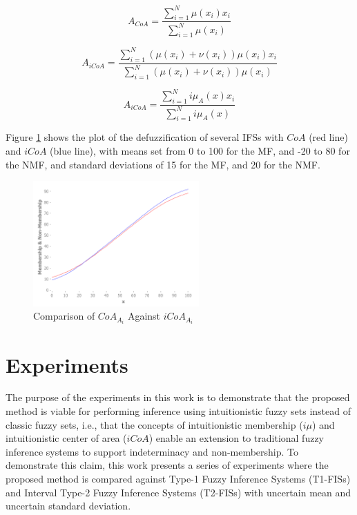 \documentclass[conference]{IEEEtran}
\begin{document}
\begin{equation}
  \label{center-of-area}
  A_{CoA} = \dfrac{\sum_{i=1}^{N} \mu(x_{i})
    x_{i}}{\sum_{i=1}^{N} \mu(x_{i})}
\end{equation}

\begin{equation}
  \label{if-coa}
  A_{iCoA} = \dfrac{\sum_{i=1}^{N} (\mu(x_{i}) + \nu(x_{i})) \mu(x_{i})
    x_{i}}{\sum_{i=1}^{N} (\mu(x_{i}) + \nu(x_{i})) \mu(x_{i})}
\end{equation}

\begin{equation}
  \label{if-coa-simplified}
  A_{iCoA} = \dfrac{\sum_{i=1}^{N} i\mu_{A}(x) x_{i}}{\sum_{i=1}^{N}
    i\mu_{A}(x)}
\end{equation}

Figure \ref{if-coa-vs-coa} shows the plot of the defuzzification of
several IFSs with $CoA$ (red line) and $iCoA$ (blue line), with means set
from 0 to 100 for the MF, and -20 to 80 for the NMF, and standard
deviations of 15 for the MF, and 20 for the NMF.

\begin{figure}[!t]
  \centering
  \includegraphics[width=2.5in]{if-coa-vs-coa}
  \caption{Comparison of $CoA_{A_{i}}$ Against $iCoA_{A_{i}}$}
  \label{if-coa-vs-coa}
\end{figure}

\section{Experiments}
\label{experiments}

The purpose of the experiments in this work is to demonstrate that the
proposed method is viable for performing inference using
intuitionistic fuzzy sets instead of classic fuzzy sets, i.e., that
the concepts of intuitionistic membership ($i\mu$) and intuitionistic
center of area ($iCoA$) enable an extension to traditional fuzzy
inference systems to support indeterminacy and non-membership. To
demonstrate this claim, this work presents a series of experiments
where the proposed method is compared against Type-1 Fuzzy Inference
Systems (T1-FISs) and Interval Type-2 Fuzzy Inference Systems
(T2-FISs) with uncertain mean and uncertain standard deviation.
\end{document}

